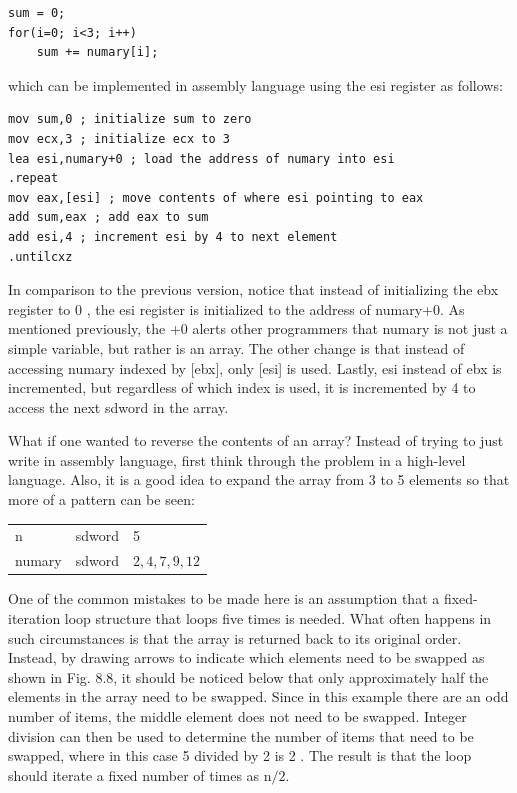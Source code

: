 \documentclass[10pt]{book}
\begin{document}
\begin{verbatim}
sum = 0;
for(i=0; i<3; i++)
    sum += numary[i];
\end{verbatim}

which can be implemented in assembly language using the esi register as follows:

\begin{verbatim}
mov sum,0 ; initialize sum to zero
mov ecx,3 ; initialize ecx to 3
lea esi,numary+0 ; load the address of numary into esi
.repeat
mov eax,[esi] ; move contents of where esi pointing to eax
add sum,eax ; add eax to sum
add esi,4 ; increment esi by 4 to next element
.untilcxz
\end{verbatim}

In comparison to the previous version, notice that instead of initializing the ebx register to 0 , the esi register is initialized to the address of numary+0. As mentioned previously, the +0 alerts other programmers that numary is not just a simple variable, but rather is an array. The other change is that instead of accessing numary indexed by [ebx], only [esi] is used. Lastly, esi instead of ebx is incremented, but regardless of which index is used, it is incremented by 4 to access the next sdword in the array.

What if one wanted to reverse the contents of an array? Instead of trying to just write in assembly language, first think through the problem in a high-level language. Also, it is a good idea to expand the array from 3 to 5 elements so that more of a pattern can be seen:

\begin{center}
\begin{tabular}{lll}
n & sdword & 5 \\
numary & sdword & $2,4,7,9,12$ \\
\end{tabular}
\end{center}

One of the common mistakes to be made here is an assumption that a fixed-iteration loop structure that loops five times is needed. What often happens in such circumstances is that the array is returned back to its original order. Instead, by drawing arrows to indicate which elements need to be swapped as shown in Fig. 8.8, it should be noticed below that only approximately half the elements in the array need to be swapped. Since in this example there are an odd number of items, the middle element does not need to be swapped. Integer division can then be used to determine the number of items that need to be swapped, where in this case 5 divided by 2 is 2 . The result is that the loop should iterate a fixed number of times as $\mathrm{n} / 2$.
\end{document}

